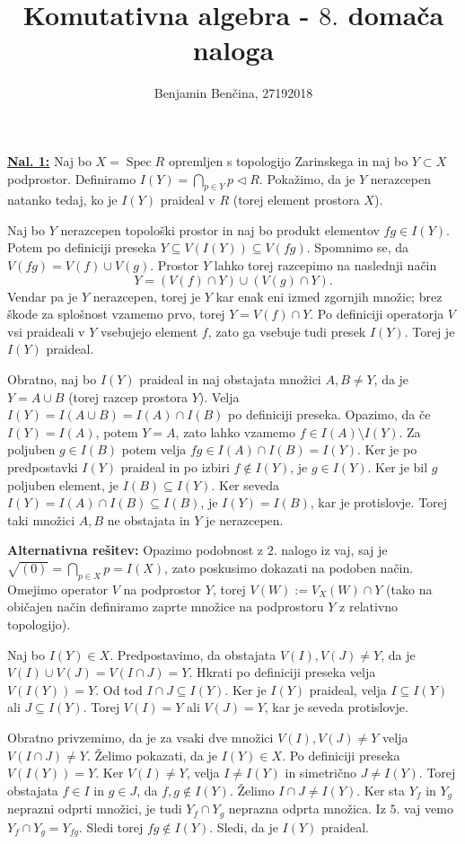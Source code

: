 \documentclass[a4paper, 12pt]{article}
\title{Komutativna algebra - $8.$ domača naloga}
\author{Benjamin Benčina, 27192018}
\DeclareMathOperator{\Spec}{Spec}
\newcommand{\subideal}{\vartriangleleft}
\begin{document}
\maketitle

\underline{\textbf{Nal. 1:}}
Naj bo $X = \Spec R$ opremljen s topologijo Zarinskega in naj bo $Y \subset X$ podprostor. Definiramo $I(Y) = \bigcap_{p \in Y} p \subideal R$. Pokažimo, da je $Y$ nerazcepen natanko tedaj, ko je $I(Y)$ praideal v $R$ (torej element prostora $X$).

Naj bo $Y$ nerazcepen topološki prostor in naj bo produkt elementov $fg \in I(Y)$. Potem po definiciji preseka $Y \subseteq V(I(Y)) \subseteq V(fg)$. Spomnimo se, da $V(fg) = V(f) \cup V(g)$. Prostor $Y$ lahko torej razcepimo na naslednji način
\[
Y = (V(f) \cap Y) \cup (V(g) \cap Y).
\]
Vendar pa je $Y$ nerazcepen, torej je $Y$ kar enak eni izmed zgornjih množic; brez škode za splošnost vzamemo prvo, torej $Y = V(f) \cap Y$. Po definiciji operatorja $V$ vsi praideali v $Y$ vsebujejo element $f$, zato ga vsebuje tudi presek $I(Y)$. Torej je $I(Y)$ praideal.

Obratno, naj bo $I(Y)$ praideal in naj obstajata množici $A, B \neq Y$, da je $Y = A \cup B$ (torej razcep prostora $Y$). Velja $I(Y) = I(A \cup B) = I(A) \cap I(B)$ po definiciji preseka. Opazimo, da če $I(Y) = I(A)$, potem $Y = A$, zato lahko vzamemo $f \in I(A)\setminus I(Y)$. Za poljuben $g \in I(B)$ potem velja $fg \in I(A)\cap I(B) = I(Y)$. Ker je po predpostavki $I(Y)$ praideal in po izbiri $f \notin I(Y)$, je $g \in I(Y)$. Ker je bil $g$ poljuben element, je $I(B) \subseteq I(Y)$. Ker seveda $I(Y) = I(A) \cap I(B) \subseteq I(B)$, je $I(Y) = I(B)$, kar je protislovje. Torej taki množici $A, B$ ne obstajata in $Y$ je nerazcepen.

\textbf{Alternativna rešitev:}
Opazimo podobnost z $2$. nalogo iz vaj, saj je $\sqrt{(0)} = \bigcap_{p \in X} p = I(X)$, zato poskusimo dokazati na podoben način.  Omejimo operator $V$ na podprostor $Y$, torej $V(W) := V_X(W) \cap Y$ (tako na običajen način definiramo zaprte množice na podprostoru $Y$ z relativno topologijo).

Naj bo $I(Y) \in X$. Predpostavimo, da obstajata $V(I), V(J) \neq Y$, da je $V(I) \cup V(J) = V(I \cap J) = Y$. Hkrati po definiciji preseka velja $V(I(Y)) = Y$. Od tod $I \cap J \subseteq I(Y)$. Ker je $I(Y)$ praideal, velja $I \subseteq I(Y)$ ali $J \subseteq I(Y)$. Torej $V(I) = Y$ ali $V(J) = Y$, kar je seveda protislovje.

Obratno privzemimo, da je za vsaki dve množici $V(I), V(J) \neq Y$ velja $V(I \cap J) \neq Y$. Želimo pokazati, da je $I(Y) \in X$. Po definiciji preseka $V(I(Y)) = Y$. Ker $V(I) \neq Y$, velja $I \neq I(Y)$ in simetrično $J \neq I(Y)$. Torej obstajata $f \in I$ in $g \in J$, da $f, g \notin I(Y)$. Želimo $I \cap J \neq I(Y)$.
Ker sta $Y_f$ in $Y_g$ neprazni odprti množici, je tudi $Y_f \cap Y_g$ neprazna odprta množica. Iz $5$. vaj vemo $Y_f \cap Y_g = Y_{fg}$. Sledi torej $fg \notin I(Y)$. Sledi, da je $I(Y)$ praideal.
\newline
\end{document}
